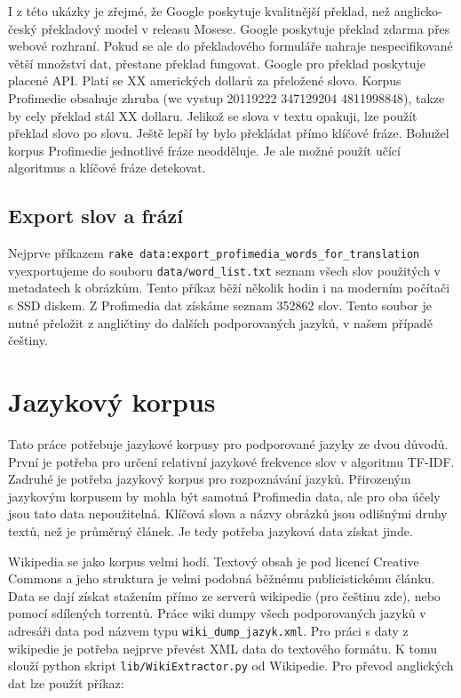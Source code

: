 I z této ukázky je zřejmé, že Google poskytuje kvalitnější překlad, než anglicko-český překladový model v releasu Mosese. Google poskytuje překlad zdarma přes webové rozhraní. Pokud se ale do překladového formuláře nahraje nespecifikované větší množství dat, přestane překlad fungovat. Google pro překlad poskytuje placené API. Platí se XX amerických dollarů za přeložené slovo. Korpus Profimedie obsahuje zhruba (wc vystup 20119222 347129204 4811998848), takze by cely překlad stál XX dollaru. Jelikož se slova v textu opakuji, lze použít překlad slovo po slovu. Ještě lepší by bylo překládat přímo klíčové fráze. Bohužel korpus Profimedie jednotlivé fráze neodděluje. Je ale možné použít učící algoritmus a klíčové fráze detekovat.

\subsection{Export slov a frází}
Nejprve příkazem \lstinline{rake data:export_profimedia_words_for_translation} vyexportujeme do souboru \lstinline{data/word_list.txt} seznam všech slov použitých v metadatech k obrázkům. Tento příkaz běží několik hodin i na moderním počítači s SSD diskem. Z Profimedia dat získáme seznam 352862 slov. Tento soubor je nutné přeložit z angličtiny do dalších podporovaných jazyků, v našem případě češtiny.

\section{Jazykový korpus}
Tato práce potřebuje jazykové korpusy pro podporované jazyky ze dvou důvodů. První je potřeba pro určení relativní jazykové frekvence slov v algoritmu TF-IDF. Zadruhé je potřeba jazykový korpus pro rozpoznávání jazyků. Přirozeným jazykovým korpusem by mohla být samotná Profimedia data, ale pro oba účely jsou tato data nepoužitelná. Klíčová slova a názvy obrázků jsou odlišnými druhy textů, než je průměrný článek. Je tedy potřeba jazyková data získat jinde.

Wikipedia se jako korpus velmi hodí. Textový obsah je pod licencí Creative Commons a jeho struktura je velmi podobná běžnému publicistickému článku. Data se dají získat stažením přímo ze serverů wikipedie (pro češtinu zde), nebo pomocí sdílených torrentů. Práce wiki dumpy všech podporovaných jazyků v adresáři data pod názvem typu \lstinline{wiki_dump_jazyk.xml}. Pro práci s daty z wikipedie je potřeba nejprve převést XML data do textového formátu. K tomu slouží python skript \lstinline{lib/WikiExtractor.py} od Wikipedie. Pro převod anglických dat lze použít příkaz:

